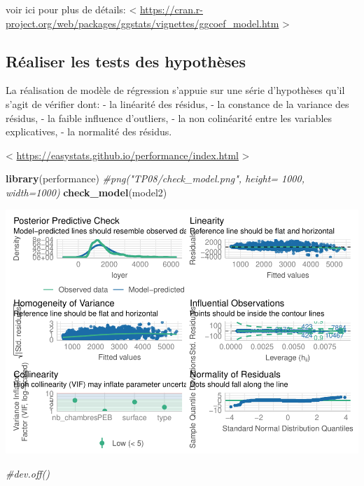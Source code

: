 \documentclass[
]{book}
\newenvironment{Shaded}{\begin{snugshade}}{\end{snugshade}}
\newcommand{\CommentTok}[1]{\textcolor[rgb]{0.56,0.35,0.01}{\textit{#1}}}
\newcommand{\FunctionTok}[1]{\textcolor[rgb]{0.13,0.29,0.53}{\textbf{#1}}}
\newcommand{\NormalTok}[1]{#1}
\begin{document}
voir ici pour plus de détails: \textless{}
\url{https://cran.r-project.org/web/packages/ggstats/vignettes/ggcoef_model.htm}
\textgreater{}

\hypertarget{ruxe9aliser-les-tests-des-hypothuxe8ses}{%
\subsection{Réaliser les tests des hypothèses}\label{ruxe9aliser-les-tests-des-hypothuxe8ses}}

La réalisation de modèle de régression s'appuie sur une série
d'hypothèses qu'il s'agit de vérifier dont: - la linéarité des
résidus, - la constance de la variance des résidus, - la faible
influence d'outliers, - la non colinéarité entre les variables
explicatives, - la normalité des résidus.

\textless{} \url{https://easystats.github.io/performance/index.html} \textgreater{}

\begin{Shaded}
\begin{Highlighting}[]
\FunctionTok{library}\NormalTok{(performance)}
\CommentTok{\#png("TP08/check\_model.png", height= 1000, width=1000)}
\FunctionTok{check\_model}\NormalTok{(model2)}
\end{Highlighting}
\end{Shaded}

\includegraphics{manuel_geo_quanti_files/figure-latex/unnamed-chunk-21-1.pdf}

\begin{Shaded}
\begin{Highlighting}[]
\CommentTok{\#dev.off()}
\end{Highlighting}
\end{Shaded}
\end{document}
